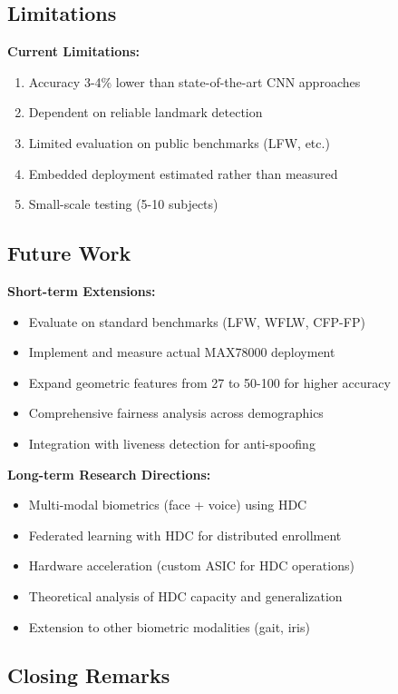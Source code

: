\documentclass[a4paper,12pt]{article}
\begin{document}
\subsection{Limitations}

\textbf{Current Limitations:}
\begin{enumerate}
    \item Accuracy 3-4\% lower than state-of-the-art CNN approaches
    \item Dependent on reliable landmark detection
    \item Limited evaluation on public benchmarks (LFW, etc.)
    \item Embedded deployment estimated rather than measured
    \item Small-scale testing (5-10 subjects)
\end{enumerate}

\subsection{Future Work}

\textbf{Short-term Extensions:}
\begin{itemize}
    \item Evaluate on standard benchmarks (LFW, WFLW, CFP-FP)
    \item Implement and measure actual MAX78000 deployment
    \item Expand geometric features from 27 to 50-100 for higher accuracy
    \item Comprehensive fairness analysis across demographics
    \item Integration with liveness detection for anti-spoofing
\end{itemize}

\textbf{Long-term Research Directions:}
\begin{itemize}
    \item Multi-modal biometrics (face + voice) using HDC
    \item Federated learning with HDC for distributed enrollment
    \item Hardware acceleration (custom ASIC for HDC operations)
    \item Theoretical analysis of HDC capacity and generalization
    \item Extension to other biometric modalities (gait, iris)
\end{itemize}

\subsection{Closing Remarks}
\end{document}
